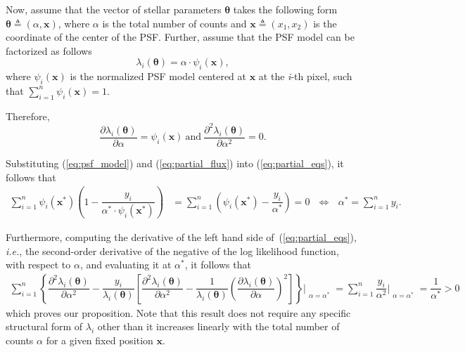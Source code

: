 \documentclass{rnaastex}
\begin{document}
Now, assume that the vector of stellar parameters $\bm{\theta}$ takes the following form $\bm{\theta} \triangleq (\alpha, \bm{x})$, where $\alpha$ is the total number of counts and $\bm{x} \triangleq (x_1, x_2)$ is the coordinate of the center of the PSF. Further, assume that the PSF model can be factorized as follows
\begin{equation}
    \lambda_i(\bm{\theta}) = \alpha\cdot\psi_i(\bm{x}),
    \label{eq:psf_model}
\end{equation}
where $\psi_i(\bm{x})$ is the normalized PSF model centered at $\bm{x}$ at the \textit{i}-th pixel, such
that $\sum_{i=1}^{n}\psi_i(\bm{x})=1$.

Therefore,
\begin{equation}
    \dfrac{\partial{\lambda_i(\bm{\theta})}}{\partial \alpha} = \psi_i(\bm{x})~\text{and}~
    \dfrac{\partial^2{\lambda_i(\bm{\theta})}}{\partial \alpha^2} = 0.
    \label{eq:partial_flux}
\end{equation}

Substituting (\ref{eq:psf_model}) and (\ref{eq:partial_flux}) into (\ref{eq:partial_eqs}), it follows that
\begin{align}
    \sum_{i=1}^{n} \psi_i(\bm{x}^{*})\left(1 - \dfrac{y_i}{\alpha^{*}\cdot\psi_i(\bm{x}^{*})} \right) &= \sum_{i=1}^{n} \left(\psi_i(\bm{x}^{*}) -  \dfrac{y_i}{\alpha^{*}}\right) = 0~~~\Leftrightarrow~~~\alpha^{*} = \sum_{i=1}^{n} y_i.
    \label{eq:tada}
\end{align}

Furthermore, computing the derivative of the left hand side of~(\ref{eq:partial_eqs}), \textit{i.e.},
the second-order derivative of the negative of the log likelihood function, with respect to $\alpha$,
and evaluating it at $\alpha^{*}$, it follows that
\begin{align}
    \sum_{i=1}^{n}\left\{\dfrac{\partial^2 \lambda_i\left(\bm{\theta}\right)}{\partial \alpha^2}
    - \dfrac{y_i}{\lambda_i\left(\bm{\theta}\right)}\left[\dfrac{\partial^2 \lambda_i
    \left(\bm{\theta}\right)}{\partial \alpha^2} - \dfrac{1}{\lambda_i\left(\bm{\theta}\right)}
    \left(\dfrac{\partial \lambda_i\left(\bm{\theta}\right)}{\partial \alpha}\right)^2\right]\right\}\Bigr|_{\substack{\alpha=\alpha^{*}}} = \sum_{i=1}^{n}\dfrac{y_i}{\alpha^2}\Bigr|_{\substack{\alpha=\alpha^{*}}} = \dfrac{1}{\alpha^{*}} > 0
    \label{eq:partial2_eqs}
\end{align}
which proves our proposition. Note that this result does not require any specific structural form of $\lambda_i$ other than it increases linearly with the total number of counts $\alpha$ for a given fixed position $\bm{x}$.
\end{document}
